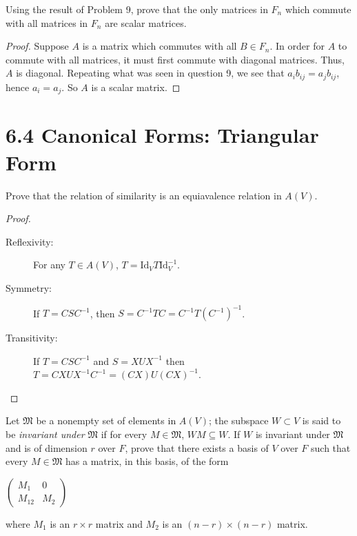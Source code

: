 \documentclass[12pt,leqno]{article}
\numberwithin{equation}{section}
\newcommand{\question}[2] {\vspace{.25in} \noindent\fbox{#1} #2 \vspace{.10in}}
\theoremstyle{definition}
\begin{document}
\question{10}{Using the result of Problem 9, prove that the only matrices in $F_n$ which commute with all matrices in $F_n$ are scalar matrices.}

\begin{proof}
 Suppose $A$ is a matrix which commutes with all $B\in F_n$. In order for $A$ to commute with all matrices, it must first commute with diagonal matrices. Thus, $A$ is diagonal. Repeating what was seen in question 9, we see that $a_ib_{ij}=a_jb_{ij}$, hence $a_i=a_j$. So $A$ is a scalar matrix.
\end{proof}


\section*{6.4 Canonical Forms: Triangular Form}
\question{1}{Prove that the relation of similarity is an equiavalence relation in $A(V)$.}

\begin{proof}
 \begin{description}
  \item [Reflexivity:] For any $T\in A(V)$, $T=\text{Id}_VT\text{Id}_V^{-1}$.
  \item [Symmetry:] If $T=CSC^{-1}$, then $S=C^{-1}TC=C^{-1}T(C^{-1})^{-1}$.
  \item [Transitivity:] If $T=CSC^{-1}$ and $S=XUX^{-1}$ then $T=CXUX^{-1}C^{-1}=(CX)U(CX)^{-1}$.
 \end{description}
\end{proof}

\question{9}{Let $\mathfrak{M}$ be a nonempty set of elements in $A(V)$; the subspace $W\subset V$ is said to be \textit{invariant under} $\mathfrak{M}$ if for every $M\in\mathfrak{M}$, $WM\subseteq W$. If $W$ is invariant under $\mathfrak{M}$ and is of dimension $r$ over $F$, prove that there exists a basis of $V$ over $F$ such that every $M\in\mathfrak{M}$ has a matrix, in this basis, of the form \begin{center}$\left(\begin{array}{c|c}M_1&0\\\hline M_{12}&M_2\end{array}\right)$\end{center}where $M_1$ is an $r\times r$ matrix and $M_2$ is an $(n-r)\times(n-r)$ matrix.}
\end{document}
